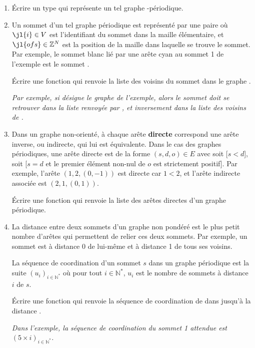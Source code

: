 \documentclass{article}
\newcommand{\paren}[1]{\ensuremath{\left(#1\right)}}
\newcommand{\seq}[3]{\ensuremath{\left(#1_{#2}\right)_{#2\in#3}}}
\newcommand{\N}{\mathbb{N}}
\newcommand{\Z}{\mathbb{Z}}
\begin{document}
\begin{enumerate}
	\item Écrire un type  qui représente un tel graphe -périodique.

	\item Un sommet d'un tel graphe périodique est représenté par une paire  où $\jl{i}\in V$ est l'identifiant du sommet dans la maille élémentaire, et $\jl{ofs}\in\Z^N$ est la position de la maille dans laquelle se trouve le sommet. Par exemple, le sommet blanc lié par une arête cyan au sommet 1 de l'exemple est le sommet .

	Écrire une fonction  qui renvoie la liste des voisins du sommet  dans le graphe .

	\textsl{Par exemple, si  désigne le graphe de l'exemple, alors le sommet  doit se retrouver dans la liste renvoyée par , et inversement  dans la liste des voisins de .}

	\item Dans un graphe non-orienté, à chaque arête \textbf{directe} correspond une arête inverse, ou indirecte, qui lui est équivalente. Dans le cas des graphes périodiques, une arête directe est de la forme $(s, d, o)\in E$ avec soit  [$s < d$], soit [$s = d$ et le premier élément non-nul de $o$ est strictement positif]. Par exemple, l'arête $(1, 2, (0, -1))$ est directe car $1 < 2$, et l'arête indirecte associée est $(2, 1, (0, 1))$.

	Écrire une fonction  qui renvoie la liste des arêtes directes d'un graphe périodique.
	
	\item La distance entre deux sommets d'un graphe non pondéré est le plus petit nombre d'arêtes qui permettent de relier ces deux sommets. Par exemple, un sommet est à distance 0 de lui-même et à distance 1 de tous ses voisins.

	La séquence de coordination d'un sommet $s$ dans un graphe périodique est la suite $\seq ui{\N^*}$ où pour tout $i\in\N^*$, $u_i$ est le nombre de sommets à distance $i$ de $s$.
	
	Écrire une fonction  qui renvoie la séquence de coordination de  dans  jusqu'à la distance .
	
	\textit{Dans l'exemple, la séquence de coordination du sommet 1 attendue est $\paren{5\times i}_{i \in\N^*}$.}
\end{enumerate}
\end{document}
